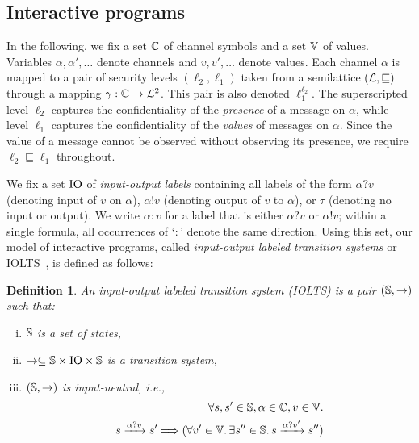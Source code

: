 \documentclass[preprint,5p,twocolumn]{elsarticle}
\newtheorem{definition}[theorem]{Definition}
\begin{document}
\subsection{Interactive programs}

In the following, we fix a set $\mathbb{C}$ of channel symbols and a set $\mathbb{V}$ of values.
Variables $\alpha, \alpha', \dots$ denote channels and $v, v', \dots$ denote values.
Each channel $\alpha$ is mapped to a pair of security levels $(\ell_2,\ell_1)$ taken from a
semilattice $(\mathcal{L}, \sqsubseteq)$ through a mapping $\gamma : \mathbb{C} \rightarrow \mathcal{L}^2$. This pair is also denoted $\ell_1^{\ell_2}$. The superscripted level $\ell_2$ captures
the confidentiality of the \emph{presence} of a message on $\alpha$, while level 
$\ell_1$ captures the confidentiality of the \emph{values} of messages on $\alpha$.
Since the value of a message cannot be observed without observing its presence, we require
$\ell_2 \sqsubseteq \ell_1$ throughout.

We fix a set $\mathrm{IO}$ of \emph{input-output labels} containing all labels of the form
$\alpha ? v$ (denoting input of $v$ on $\alpha$), $\alpha ! v$ (denoting output of $v$ to $\alpha$), or $\tau$ (denoting no input or output).
We write $\alpha : v$ for a label that is either $\alpha ? v$ or $\alpha ! v$; within a single
formula, all occurrences of `$:$' denote the same direction.
Using this set, our model of interactive programs, called
\emph{input-output labeled transition systems} or IOLTS~\cite{Rafnsson2012}, is defined as follows:

  \label{def:iolts}
\begin{definition}
  An \emph{input-output labeled transition system} (IOLTS) is a pair $(\mathbb{S}, \rightarrow)$ such that:
  \begin{enumerate}[(i)]
  \item $\mathbb{S}$ is a set of states,
  \item $\rightarrow \subseteq \mathbb{S} \times \mathrm{IO} \times \mathbb{S}$ is a transition system,
  \item $(\mathbb{S}, \rightarrow)$ is \emph{input-neutral}, i.e.,
  \begin{align*}
    \forall s, s' \in \mathbb{S}, \alpha \in \mathbb{C}, v \in \mathbb{V}.\\
    s \xrightarrow{\alpha ? v} s' \Longrightarrow (\forall v' \in \mathbb{V}.\,\exists s'' \in \mathbb{S}.\,s \xrightarrow{\alpha ? v'} s'')
  \end{align*}
  \end{enumerate}
\end{definition}
\end{document}
